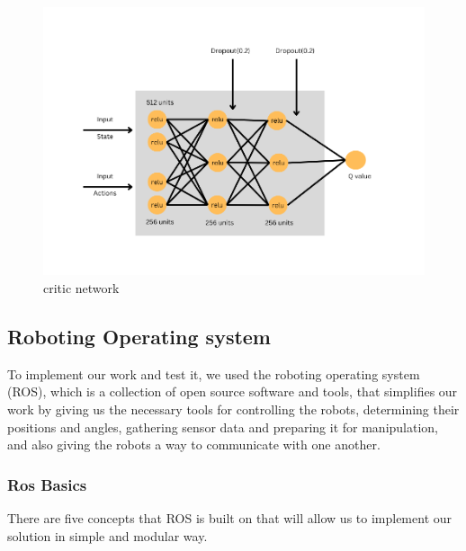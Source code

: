 \documentclass[12pt]{extarticle}
\begin{document}
 \begin{figure}[h]  
\centering
\includegraphics[scale=0.65]{critic_net}
\caption[critic network]{critic network}
\end{figure}








\pagebreak









\newpage







\subsection{Roboting Operating system}
To implement our work and test it, we used the roboting operating system (ROS), which is  a collection of open source software and tools, that 
 simplifies our work by giving us the necessary tools for controlling the robots, determining their positions and angles, gathering sensor data and preparing it for manipulation, and also giving the robots a way to communicate with one another.

\subsubsection{Ros Basics}
There are five concepts that ROS is built on that will allow us to implement our solution in  simple and modular way.
\end{document}
